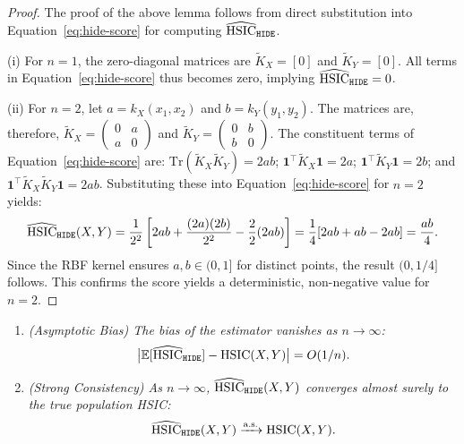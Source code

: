 \begin{proof}
The proof of the above lemma follows from direct substitution into Equation~\ref{eq:hide-score} for computing \(\widehat{\operatorname{HSIC}}_{\texttt{HIDE}}\).

(i) For \(n=1\), the zero-diagonal matrices are \(\tilde K_X = [0]\) and \(\tilde K_Y = [0]\). All terms in Equation~\ref{eq:hide-score} thus becomes zero, implying \(\widehat{\operatorname{HSIC}}_{\texttt{HIDE}} = 0\).

(ii) For \(n=2\), let \(a = k_X(x_1,x_2)\) and \(b = k_Y(y_1,y_2)\). The matrices are, therefore, \(\tilde K_X = \begin{pmatrix} 0 & a \\ a & 0 \end{pmatrix}\) and \(\tilde K_Y = \begin{pmatrix} 0 & b \\ b & 0 \end{pmatrix}\). The constituent terms of Equation~\ref{eq:hide-score} are: \(\text{Tr}(\tilde K_X\tilde K_Y) = 2ab\); \(\mathbf{1}^{\!\top}\tilde K_X\mathbf{1} = 2a\); \(\mathbf{1}^{\!\top}\tilde K_Y\mathbf{1} = 2b\); and \(\mathbf{1}^{\!\top}\tilde K_X\tilde K_Y\mathbf{1} = 2ab\). Substituting these into Equation~\ref{eq:hide-score} for \(n=2\) yields:
\[ \widehat{\operatorname{HSIC}}_{\texttt{HIDE}}(X,Y) = \frac{1}{2^2} \left[ 2ab + \frac{(2a)(2b)}{2^2} - \frac{2}{2}(2ab) \right] = \frac{1}{4} [2ab + ab - 2ab] = \frac{ab}{4}. \]
Since the RBF kernel ensures \(a, b \in (0,1]\) for distinct points, the result \( (0, 1/4]\) follows. This confirms the score yields a deterministic, non-negative value for \(n=2\).
\end{proof}


\begin{lemma}
\label{lem:asymptotic_properties}
\begin{enumerate}
    \item[\textit{(i)}] \textit{(Asymptotic Bias) The bias of the estimator vanishes as \(n \to \infty\):
    \[ \bigl|\mathbb{E}[\widehat{\operatorname{HSIC}}_{\texttt{HIDE}}] - \operatorname{HSIC}(X,Y)\bigr| = O(1/n). \]}
    \item[\textit{(ii)}] \textit{(Strong Consistency) As \(n \to \infty\), \(\widehat{\operatorname{HSIC}}_{\texttt{HIDE}}(X,Y)\) converges almost surely to the true population HSIC:
    \[ \widehat{\operatorname{HSIC}}_{\method}(X,Y) \xrightarrow{\text{a.s.}} \operatorname{HSIC}(X,Y). \]}
\end{enumerate}
\end{lemma}

